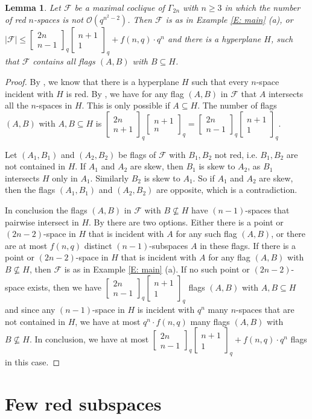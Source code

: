 \documentclass[11pt, oneside, a4paper]{article}
\newtheorem{lemma}[thm]{Lemma}
\newcommand{\EKR}{\mathcal{F}}
\newcommand{\OO}{\mathcal{O}}
\newcommand{\Gauss}[2]{{\begin{bmatrix} #1 \\ #2 \end{bmatrix}_q}}
\begin{document}
\begin{lemma}
    Let $\EKR$ be a maximal coclique of $\Gamma_{2n}$ with $n\geq 3$ in which the number of red $n$-spaces is not $\OO(q^{n^2-2})$. Then $\EKR$ is as in Example \ref{E: main} (a), or $|\EKR|\leq  \Gauss{2n}{n-1} \Gauss{n+1}{1} +f(n,q)\cdot q^n $ and there is a hyperplane $H$, such that $\EKR$ contains all flags $(A,B)$ with $B\subseteq H$.
\end{lemma}

\begin{proof}
    By , we know that there is a hyperplane $H$ such that every $n$-space incident with $H$ is red. By , we have for any flag $(A,B)$ in $\EKR$ that $A$ intersects all the $n$-spaces in $H$. This is only possible if $A\subseteq H$. The number of flags $(A,B)$ with $A,B\subseteq H$ is $\Gauss{2n}{n+1} \Gauss{n+1}{n}=\Gauss{2n}{n-1} \Gauss{n+1}{1}$.

    Let $(A_1,B_1)$ and $(A_2,B_2)$ be flags of $\EKR$ with $B_1,B_2$ not red, i.e. $B_1,B_2$ are not contained in $H$. If $A_1$ and $A_2$ are skew, then $B_1$ is skew to $A_2$, as $B_1$ intersects $H$ only in $A_1$. Similarly $B_2$ is skew to $A_1$. So if $A_1$ and $A_2$ are skew, then the flags $(A_1,B_1)$ and $(A_2,B_2)$ are opposite, which is a contradiction. 

    In conclusion the flags $(A,B)$ in $\EKR$ with $B\not\subseteq H$ have $(n-1)$-spaces that pairwise intersect in $H$. By  there are two options. Either there is a point or $(2n-2)$-space in $H$ that is incident with $A$ for any such flag $(A,B)$, or there are at most $f(n,q)$ distinct $(n-1)$-subspaces $A$ in these flags. 
    If there is a point or $(2n-2)$-space in $H$ that is incident with $A$ for any flag $(A,B)$ with $B\not\subseteq H$, then $\EKR$ is as in Example \ref{E: main} (a).
    If no such point or $(2n-2)$-space exists, then we have $ \Gauss{2n}{n-1} \Gauss{n+1}{1}$ flags $(A,B)$ with $A,B\subseteq H$ and since any $(n-1)$-space in $H$ is incident with $q^n$ many $n$-spaces that are not contained in $H$, we have at most $q^n\cdot f(n,q)$ many flags $(A,B)$ with $B\not\subseteq H$. In conclusion, we have at most $\Gauss{2n}{n-1} \Gauss{n+1}{1} +f(n,q)\cdot q^n$ flags in this case.
\end{proof}



\section{Few red subspaces}
\end{document}
